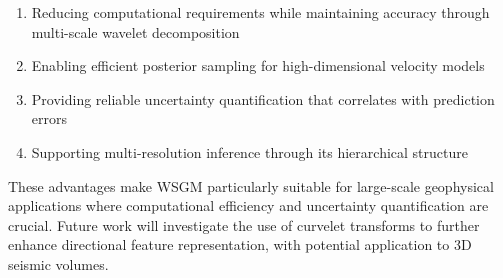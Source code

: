 \documentclass{IMAGE2025}
\begin{document}
\begin{enumerate}
\def\labelenumi{\arabic{enumi}.}
\tightlist
\item
  Reducing computational requirements while maintaining accuracy through
  multi-scale wavelet decomposition
\item
  Enabling efficient posterior sampling for high-dimensional velocity
  models
\item
  Providing reliable uncertainty quantification that correlates with
  prediction errors
\item
  Supporting multi-resolution inference through its hierarchical
  structure
\end{enumerate}

These advantages make WSGM particularly suitable for large-scale
geophysical applications where computational efficiency and uncertainty
quantification are crucial. Future work will investigate the use of
curvelet transforms to further enhance directional feature
representation, with potential application to 3D seismic volumes.
\end{document}
